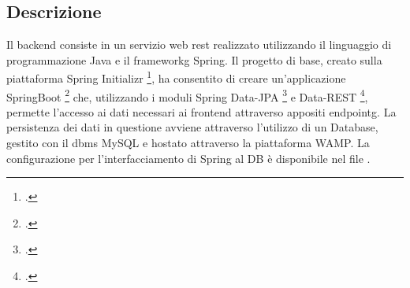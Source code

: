 \subsection{Descrizione}
Il \gls{backend} consiste in un servizio web \gls{rest} realizzato utilizzando il linguaggio di programmazione Java e il \gls{frameworkg} Spring. Il progetto di base, creato sulla piattaforma Spring Initializr \footcite{spring-initializr}, ha consentito di creare un'applicazione SpringBoot \footcite{spring-boot} che, utilizzando i moduli Spring Data-JPA \footcite{spring-jpa} e Data-REST \footcite{spring-rest}, permette l'accesso ai dati necessari ai \gls{frontend} attraverso appositi \gls{endpointg}. La persistenza dei dati in questione avviene attraverso l'utilizzo di un Database, gestito con il \gls{dbms} MySQL e hostato attraverso la piattaforma WAMP. La configurazione per l'interfacciamento di Spring al DB è disponibile nel file .

